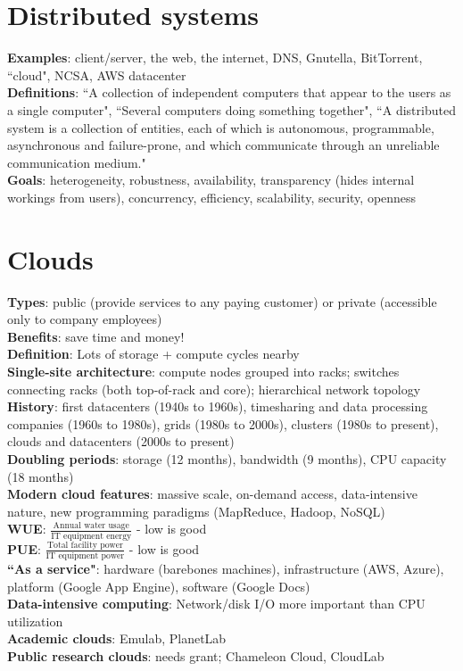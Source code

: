 \documentclass{article}
\begin{document}
\fontsize{5}{6}
\selectfont
\begin{multicols*}{3}
\section{Distributed systems}
\textbf{Examples}: client/server, the web, the internet, DNS, Gnutella, BitTorrent, ``cloud", NCSA, AWS datacenter \\
\textbf{Definitions}: ``A collection of independent computers that appear to the users as a single computer", ``Several computers doing something together", ``A distributed system is a collection of entities, each of which is autonomous, programmable, asynchronous and failure-prone, and which communicate through an unreliable communication medium." \\
\textbf{Goals}: heterogeneity, robustness, availability, transparency (hides internal workings from users), concurrency, efficiency, scalability, security, openness

\section{Clouds}
\textbf{Types}: public (provide services to any paying customer) or private (accessible only to company employees) \\
\textbf{Benefits}: save time and money! \\
\textbf{Definition}: Lots of storage + compute cycles nearby \\
\textbf{Single-site architecture}: compute nodes grouped into racks; switches connecting racks (both top-of-rack and core); hierarchical network topology \\
\textbf{History}: first datacenters (1940s to 1960s), timesharing and data processing companies (1960s to 1980s), grids (1980s to 2000s), clusters (1980s to present), clouds and datacenters (2000s to present) \\
\textbf{Doubling periods}: storage (12 months), bandwidth (9 months), CPU capacity (18 months) \\
\textbf{Modern cloud features}: massive scale, on-demand access, data-intensive nature, new programming paradigms (MapReduce, Hadoop, NoSQL) \\
\textbf{WUE}: $\frac{\text{Annual water usage}}{\text{IT equipment energy}}$ - low is good \\
\textbf{PUE}: $\frac{\text{Total facility power}}{\text{IT equipment power}}$ - low is good \\
\textbf{``As a service"}: hardware (barebones machines), infrastructure (AWS, Azure), platform (Google App Engine), software (Google Docs) \\
\textbf{Data-intensive computing}: Network/disk I/O more important than CPU utilization \\
\textbf{Academic clouds}: Emulab, PlanetLab \\
\textbf{Public research clouds}: needs grant; Chameleon Cloud, CloudLab


\end{multicols*}
\end{document}
